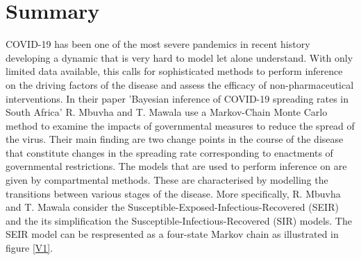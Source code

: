 \section{Summary}
COVID-19 has been one of the most severe pandemics in recent history developing a dynamic that is very hard to model let alone understand. With only limited data available, this calls for sophisticated methods to perform inference on the driving factors of the disease and assess the efficacy of non-pharmaceutical interventions. In their paper 'Bayesian inference of COVID-19 spreading rates in South Africa' R. Mbuvha and T. Mawala use a Markov-Chain Monte Carlo method to examine the impacts of governmental measures to reduce the spread of the virus. Their main finding are two change points in the course of the disease that constitute changes in the spreading rate corresponding to enactments of governmental restrictions. 
\newline \newline
The models that are used to perform inference on are given by compartmental methods. These are characterised by modelling the transitions between various stages of the disease. More specifically, R. Mbuvha and T. Mawala consider the Susceptible-Exposed-Infectious-Recovered  (SEIR) and the its simplification the Susceptible-Infectious-Recovered (SIR) models. The SEIR model can be respresented as a four-state Markov chain as illustrated in figure \ref{V1}.

